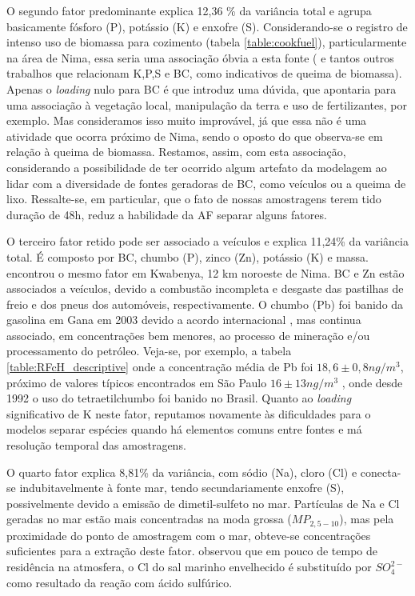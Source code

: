 O segundo fator predominante explica 12,36 \% da variância total e agrupa 
basicamente fósforo (P), potássio (K) e enxofre (S). Considerando-se o registro
de intenso uso de biomassa para cozimento (tabela \ref{table:cookfuel}), 
particularmente na área de Nima, essa seria uma associação óbvia a esta fonte
(\citet{reid2005} e tantos outros trabalhos que relacionam K,P,S e BC, 
como indicativos de queima de biomassa). Apenas o \textit{loading} nulo para BC 
é que introduz uma dúvida, que apontaria para uma associação à vegetação local, 
manipulação da terra e uso de fertilizantes, por exemplo. Mas consideramos isso 
muito improvável, já que essa não é uma atividade que ocorra próximo de Nima, 
sendo o oposto do que observa-se em relação à queima de biomassa. Restamos, 
assim, com esta associação, considerando a possibilidade de ter ocorrido algum 
artefato da modelagem ao lidar com a diversidade de fontes geradoras de BC, 
como veículos ou a queima de lixo. Ressalte-se, em particular, que o fato de 
nossas amostragens terem tido duração de 48h, reduz a habilidade da AF separar 
alguns fatores.

O terceiro fator retido pode ser associado a veículos e explica 11,24\% da 
variância total. É composto por BC, chumbo (P), zinco (Zn), potássio (K) e 
massa. \citet{aboh2009} encontrou o mesmo fator em Kwabenya, 12 km noroeste de 
Nima. BC e Zn estão associados a veículos, devido a combustão incompleta e 
desgaste das pastilhas de freio e dos pneus dos automóveis, respectivamente. 
O chumbo (Pb) foi banido da gasolina em Gana em 2003 devido a acordo 
internacional \citep{epa2015}, mas continua associado, em concentrações bem 
menores, ao processo de mineração e/ou processamento do petróleo. 
Veja-se, por exemplo, a tabela \ref{table:RFcH_descriptive} onde a concentração 
média de Pb foi $18,6 \pm 0,8 n g /m^3$, próximo de valores típicos encontrados 
em São Paulo $16 \pm 13 n g /m^3$ \citep{andrade2012}, onde desde 1992 o uso do 
tetraetilchumbo foi banido no Brasil. Quanto ao \textit{loading} significativo 
de K neste fator, reputamos novamente às dificuldades para o modelos separar 
espécies quando há elementos comuns entre fontes e má resolução temporal das 
amostragens.

O quarto fator explica 8,81\% da variância, com sódio (Na), cloro (Cl) e
conecta-se indubitavelmente à fonte mar, tendo secundariamente enxofre (S), 
possivelmente devido a emissão de dimetil-sulfeto no mar.
Partículas de Na e Cl geradas no mar estão mais concentradas na moda grossa 
($MP_{2,5-10}$), mas pela proximidade do ponto de amostragem com o mar, 
obteve-se concentrações suficientes para a extração deste fator. 
\citet{mcinnes1994} observou que em pouco de tempo de residência na atmosfera, 
o Cl do sal marinho envelhecido é substituído por $SO_4^{2-}$ como resultado 
da reação com ácido sulfúrico.

